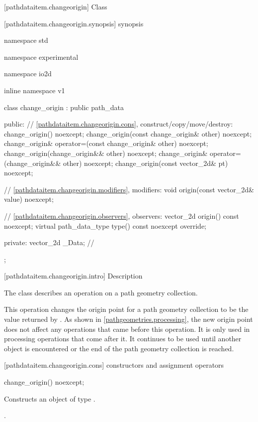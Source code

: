  [pathdataitem.changeorigin] {Class }

 [pathdataitem.changeorigin.synopsis] { synopsis}

\begin{codeblock}
namespace std { namespace experimental { namespace io2d { inline namespace v1 {
  class change_origin : public path_data {
  public:
    // \ref{pathdataitem.changeorigin.cons}, construct/copy/move/destroy:
    change_origin() noexcept;
    change_origin(const change_origin& other) noexcept;
    change_origin& operator=(const change_origin& other) noexcept;
    change_origin(change_origin&& other) noexcept;
    change_origin& operator=(change_origin&& other) noexcept;
    change_origin(const vector_2d& pt) noexcept;

    // \ref{pathdataitem.changeorigin.modifiers}, modifiers:
    void origin(const vector_2d& value) noexcept;

    // \ref{pathdataitem.changeorigin.observers}, observers:
    vector_2d origin() const noexcept;
    virtual path_data_type type() const noexcept override;
    
  private:
    vector_2d _Data; // \expos
  };
} } } }
\end{codeblock}

 [pathdataitem.changeorigin.intro] { Description}

\pnum
{}
The class  describes an operation on a path geometry collection.

\pnum
This operation changes the origin point for a path geometry collection to be the value returned by . As shown in \ref{pathgeometries.processing}, the new origin point does not affect any operations that came before this operation. It is only used in processing operations that come after it. It continues to be used until another  object is encountered or the end of the path geometry collection is reached.

 [pathdataitem.changeorigin.cons] { constructors and assignment operators}

\begin{itemdecl}
    change_origin() noexcept;
\end{itemdecl}
\begin{itemdescr}
	\pnum
	\effects
	Constructs an object of type .
	
	\pnum
	\postconditions
	.
\end{itemdescr}

